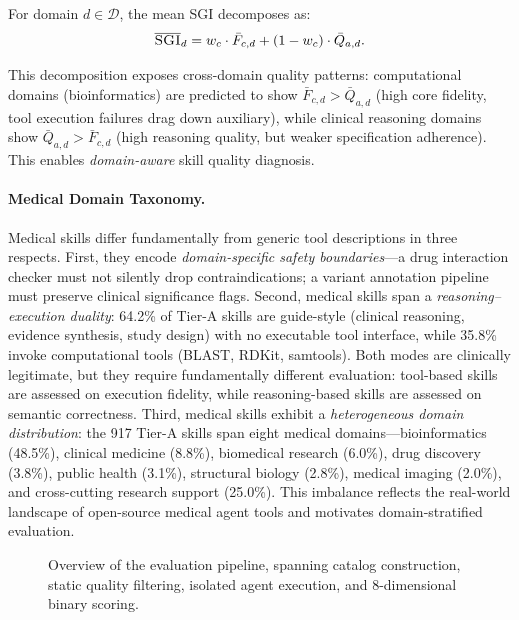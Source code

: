 \begin{proposition}
\label{prop:sgi_domain}
For domain $d \in \mathcal{D}$, the mean \textsc{SGI} decomposes as:
\begin{equation}
    \overline{\textsc{SGI}}_d = w_c \cdot \bar{F}_{c,d} + (1 - w_c) \cdot \bar{Q}_{a,d}.
    \label{eq:sgi_domain}
\end{equation}
\end{proposition}
\noindent This decomposition exposes cross-domain quality patterns: computational domains (bioinformatics) are predicted to show $\bar{F}_{c,d} > \bar{Q}_{a,d}$ (high core fidelity, tool execution failures drag down auxiliary), while clinical reasoning domains show $\bar{Q}_{a,d} > \bar{F}_{c,d}$ (high reasoning quality, but weaker specification adherence).
This enables \emph{domain-aware} skill quality diagnosis.

\paragraph{Medical Domain Taxonomy.}
Medical skills differ fundamentally from generic tool descriptions in three respects.
First, they encode \emph{domain-specific safety boundaries}---a drug interaction checker must not silently drop contraindications; a variant annotation pipeline must preserve clinical significance flags.
Second, medical skills span a \emph{reasoning--execution duality}: 64.2\% of Tier-A skills are guide-style (clinical reasoning, evidence synthesis, study design) with no executable tool interface, while 35.8\% invoke computational tools (BLAST, RDKit, samtools).
Both modes are clinically legitimate, but they require fundamentally different evaluation: tool-based skills are assessed on execution fidelity, while reasoning-based skills are assessed on semantic correctness.
Third, medical skills exhibit a \emph{heterogeneous domain distribution}: the 917 Tier-A skills span eight medical domains---bioinformatics (48.5\%), clinical medicine (8.8\%), biomedical research (6.0\%), drug discovery (3.8\%), public health (3.1\%), structural biology (2.8\%), medical imaging (2.0\%), and cross-cutting research support (25.0\%).
This imbalance reflects the real-world landscape of open-source medical agent tools and motivates domain-stratified evaluation.

\begin{figure}[!t]
\caption{Overview of the \medskillbench evaluation pipeline, spanning catalog construction, static quality filtering, isolated agent execution, and 8-dimensional binary scoring.}
\label{fig:pipeline}
\end{figure}


